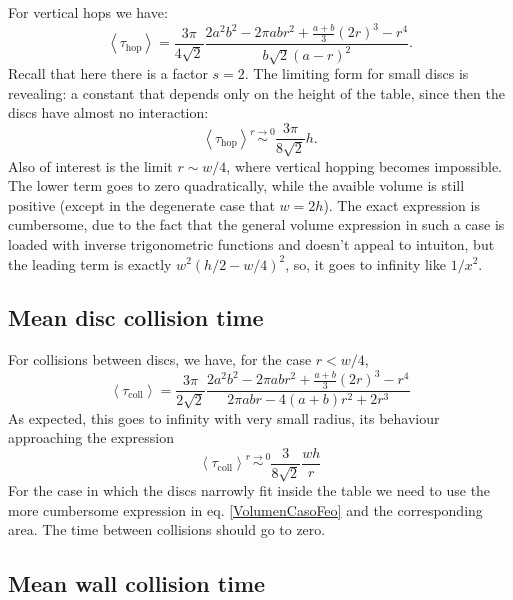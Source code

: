 \documentclass[superscriptaddress,pre,reprint,showpacs,onecolumn]{revtex4-1}
\newcommand{\mean}[1]{\left \langle #1 \right \rangle}
\begin{document}
For vertical
hops we have:
\begin{equation}\label{hoptau}
 \mean{\tau_\text{hop}} = 	
\frac{3 \pi}{4\sqrt{2}}
\frac{2 a^{2} b^{2}  - 2 \pi a b r^{2} + \textstyle \frac{a+b}{3}  (2r)^{3}  -  r^4}
{ b \sqrt{2}  ( a - r )^2}.
\end{equation}
Recall that here there is a factor $s = 2$.
The limiting form for small discs is revealing: a constant
that depends only on the height of the table, since then the discs have almost no interaction:
\begin{equation}\label{hoptaulimit}
 \mean{\tau_\text{hop}} \overset{r \to 0}{\sim}
\frac{3 \pi}{8\sqrt{2}}h.
\end{equation}
Also of interest is the limit $r\sim w/4$, where vertical hopping becomes
impossible.  The lower term goes to zero quadratically, while the avaible volume
is still positive (except in the degenerate case that $w=2h$). The exact expression
is cumbersome, due to the fact that the general volume expression in such a
case is loaded with inverse trigonometric functions and doesn't appeal to
intuiton, but the leading term is exactly $w^2(h/2-w/4)^2$, so, it goes to infinity
like $1/x^2$. 



\subsection{Mean disc collision time}

For collisions between discs, we have, for the case $r<w/4$,
\begin{equation}\label{colltau}
 \mean{\tau_\text{coll}} = 	
\frac{3 \pi}{2\sqrt{2}}
\frac {2 a^{2} b^{2}  - 2 \pi a b r^{2} + \textstyle \frac{a+b}{3}  (2r)^{3}  -  r^4}
{2\pi a b r -4(a+b)r^2+2r^3}
\end{equation}
As expected, this goes to infinity with very small radius, its behaviour
approaching the expression
\begin{equation}\label{colltaulim0}
\mean{\tau_\text{coll}} \overset{r \to 0}{\sim}
\frac{3}{8\sqrt{2}}\frac{wh}{r}
\end{equation}
For the case in which the discs narrowly fit inside the table we need to
use the more cumbersome expression in eq. \ref{VolumenCasoFeo} and
the corresponding area. The time between collisions should go to zero.


\subsection{Mean wall collision time}
\end{document}

